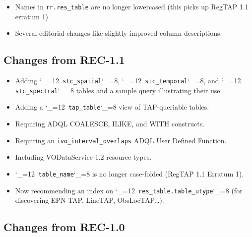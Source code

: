 \documentclass[11pt,a4paper]{ivoa}
\makeatletter
\def\rtent#1{\texttt{\color{rtcolor}\verb|#1|}}
\def\makeunderscoreletter{\catcode`\_=12}
\def\makeunderscoresubscript{\catcode`\_=8}
\def\rtent{\makeunderscoreletter\relax\rt@nt}
\def\rt@nt#1{\texttt{\color{rtcolor} #1}\makeunderscoresubscript{}}
\makeatother
\begin{document}
\begin{itemize}
\item Names in \verb|rr.res_table| are no longer lowercased (this
picks up RegTAP 1.1 erratum 1)
\item Several editorial changes like slightly improved column
descriptions.
\end{itemize}

\subsection{Changes from REC-1.1}

\begin{itemize}
\item Adding \rtent{stc_spatial}, \rtent{stc_temporal}, and
\rtent{stc_spectral} tables and a sample query illustrating their use.
\item Adding a \rtent{tap_table} view of TAP-queriable tables.
\item Requiring ADQL COALESCE, ILIKE, and WITH constructs.
\item Requiring an \texttt{ivo\_interval\_overlaps} ADQL User Defined
Function.
\item Including VODataService 1.2 resource types.
\item \rtent{table_name} is no longer case-folded (RegTAP 1.1 Erratum 1).
\item Now recommending an index on \rtent{res_table.table_utype} (for
discovering EPN-TAP, LineTAP, ObsLocTAP\dots).
\end{itemize}

\subsection{Changes from REC-1.0}
\end{document}
